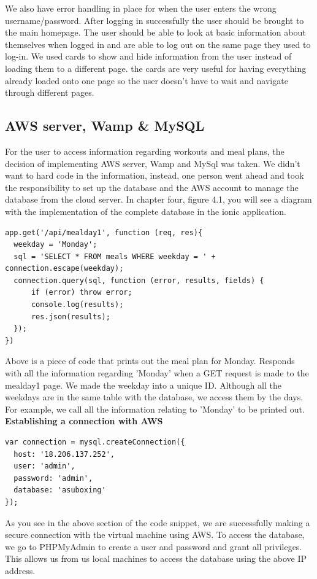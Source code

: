 \documentclass[a4paper,12pt]{report}
\begin{document}
We also have error handling in place for when the user enters the wrong username/password. After logging in successfully the user should be brought to the main homepage. The user should be able to look at basic information about themselves when logged in and are able to log out on the same page they used to log-in. We used cards to show and hide information from the user instead of loading them to a different page. the cards are very useful for having everything already loaded onto one page so the user doesn't have to wait and navigate through different pages.
\newpage
\subsection{AWS server, Wamp \& MySQL}
For the user to access information regarding workouts and meal plans, the decision of implementing AWS server, Wamp and MySql was taken. We didn't want to hard code in the information, instead, one person went ahead and took the responsibility to set up the database and the AWS account to manage the database from the cloud server. In chapter four, figure 4.1, you will see a diagram with the implementation of the complete database in the ionic application.
\begin{verbatim}
app.get('/api/mealday1', function (req, res){
  weekday = 'Monday';
  sql = 'SELECT * FROM meals WHERE weekday = ' + connection.escape(weekday);
  connection.query(sql, function (error, results, fields) {
      if (error) throw error;
      console.log(results);
      res.json(results);
  });
})
\end{verbatim}
Above is a piece of code that prints out the meal plan for Monday.
Responds with all the information regarding 'Monday' when a GET request is made to the mealday1 page. We made the weekday into a unique ID. Although all the weekdays are in the same table with the database, we access them by the days. For example, we call all the information relating to 'Monday' to be printed out.
\\
\textbf{Establishing a connection with AWS}
\begin{verbatim}
var connection = mysql.createConnection({
  host: '18.206.137.252',
  user: 'admin',
  password: 'admin',
  database: 'asuboxing'
});
\end{verbatim}
As you see in the above section of the code snippet, we are successfully making a secure connection with the virtual machine using AWS. To access the database, we go to PHPMyAdmin to create a user and password and grant all privileges. This allows us from us local machines to access the database using the above IP address. 
\end{document}
